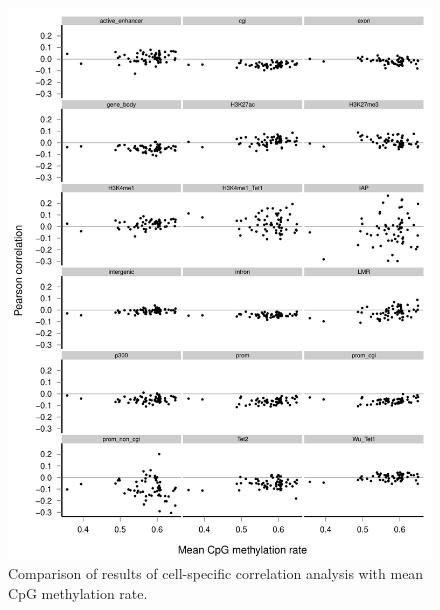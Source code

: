 \begin{figure}[htbp!]
\centering
\includegraphics[width=1.0\textwidth]{cell_r_mean}
\caption{Comparison of results of cell-specific correlation analysis with mean CpG methylation rate.}
\label{fig:mt_cell_r_mean}
\end{figure}


